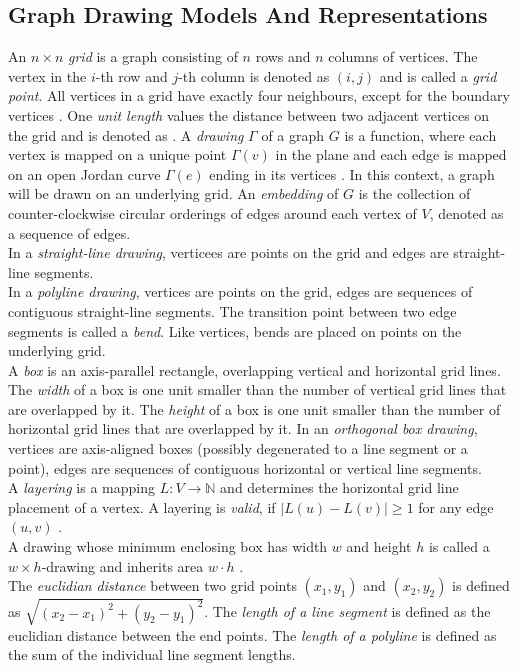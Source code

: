 \subsection{Graph Drawing Models And Representations}
An $n \times n$ \emph{grid} is a graph consisting of $n$ rows and $n$ columns of vertices. The vertex in the $i$-th row and $j$-th column is denoted as $(i,j)$ and is called a \emph{grid point}. All vertices in a grid have exactly four neighbours, except for the boundary vertices \cite[P. 760]{DBLP:cormen_intro_to_algorithms}. One \emph{unit length} values the distance between two adjacent vertices on the grid and is denoted as \UL.
A \emph{drawing} $\Gamma$ of a graph $G$ is a function, where each vertex is mapped on a unique point $\Gamma(v)$ in the plane and each edge is mapped on an open Jordan curve $\Gamma(e)$ ending in its vertices \cite[P. 225]{Duncan_planar_polyline_drawings}. In this context, a graph will be drawn on an underlying grid.
An \emph{embedding} of $G$ is the collection of counter-clockwise circular orderings of edges around each vertex of $V$, denoted as a sequence of edges.\\
In a \emph{straight-line drawing}, verticees are points on the grid and edges are straight-line segments.\\
In a \emph{polyline drawing}, vertices are points on the grid, edges are sequences of contiguous straight-line segments. The transition point between two edge segments is called a \emph{bend}. Like vertices, bends are placed on points on the underlying grid.\\
A \emph{box} is an axis-parallel rectangle, overlapping vertical and horizontal grid lines. The \emph{width} of a box is one unit smaller than the number of vertical grid lines that are overlapped by it. The \emph{height} of a box is one unit smaller than the number of horizontal grid lines that are overlapped by it.
In an \emph{orthogonal box drawing}, vertices are axis-aligned boxes (possibly degenerated to a line segment or a point), edges are sequences of contiguous horizontal or vertical line segments. \cite[P. 144ff]{Biedl_SP}\\
A \emph{layering} is a mapping $L: V \to \mathbb{N}$ and determines the horizontal grid line placement of a vertex. A layering is \emph{valid}, if $|L(u) - L(v)| \geq 1$ for any edge $(u,v)$ \cite[P. 4]{Ruegg_Layering}.\\
A drawing whose minimum enclosing box has width $w$ and height $h$ is called a $w\times h$-drawing and inherits area $w\cdot h$ \cite[P. 145]{Biedl_SP}.\\
The \emph{euclidian distance} between two grid points $(x_1,y_1)$ and $(x_2,y_2)$ is defined as $\sqrt{(x_2-x_1)^2 + (y_2-y_1)^2}$.
The \emph{length of a line segment} is defined as the euclidian distance between the end points. The \emph{length of a polyline} is defined as the sum of the individual line segment lengths.

